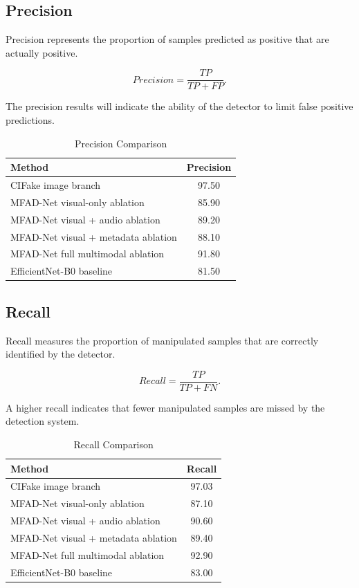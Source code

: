 \documentclass[conference]{IEEEtran}
\begin{document}
\subsection{Precision}

Precision represents the proportion of samples predicted as positive that are actually positive.

\begin{equation}
Precision =
\frac{TP}{TP+FP}.
\end{equation}

The precision results will indicate the ability of the detector to limit false positive predictions.

\begin{table}[htbp]
\caption{Precision Comparison}
\label{tab:precision}
\centering
\begin{tabular}{lc}
\hline
\textbf{Method} & \textbf{Precision}\\
\hline
CIFake image branch & 97.50\\
MFAD-Net visual-only ablation & 85.90\\
MFAD-Net visual + audio ablation & 89.20\\
MFAD-Net visual + metadata ablation & 88.10\\
MFAD-Net full multimodal ablation & 91.80\\
EfficientNet-B0 baseline & 81.50\\
\hline
\end{tabular}
\end{table}

\subsection{Recall}

Recall measures the proportion of manipulated samples that are correctly identified by the detector.

\begin{equation}
Recall =
\frac{TP}{TP+FN}.
\end{equation}

A higher recall indicates that fewer manipulated samples are missed by the detection system.

\begin{table}[htbp]
\caption{Recall Comparison}
\label{tab:recall}
\centering
\begin{tabular}{lc}
\hline
\textbf{Method} & \textbf{Recall}\\
\hline
CIFake image branch & 97.03\\
MFAD-Net visual-only ablation & 87.10\\
MFAD-Net visual + audio ablation & 90.60\\
MFAD-Net visual + metadata ablation & 89.40\\
MFAD-Net full multimodal ablation & 92.90\\
EfficientNet-B0 baseline & 83.00\\
\hline
\end{tabular}
\end{table}
\end{document}
